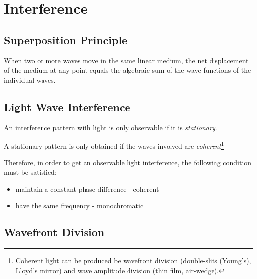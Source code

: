 \documentclass[openany]{book}
\begin{document}
\section{Interference}
\subsection{Superposition Principle}
When two or more waves move in the same linear medium, the net displacement of the medium at any point equals the algebraic sum of the wave functions of the individual waves.
\subsection{Light Wave Interference}
An interference pattern with light is only observable if it is \emph{stationary}.

A stationary pattern is only obtained if the
waves involved are \emph{coherent}\footnote{Coherent light can be produced be wavefront division (double-slits (Young’s), Lloyd’s mirror) and wave amplitude division (thin film, air-wedge).}

Therefore, in order to get an observable light interference, the following condition must be satisfied:
\begin{itemize}
\item maintain a constant phase difference - coherent
\item have the same frequency - monochromatic
\end{itemize}

\subsection{Wavefront Division}
\end{document}
